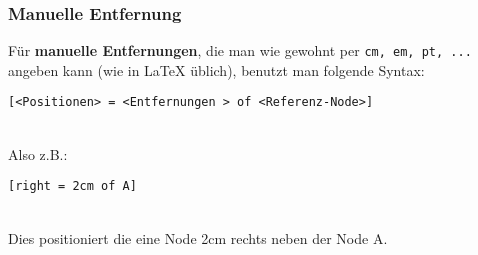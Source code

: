 \documentclass{article}
\begin{document}
		\subsubsection{Manuelle Entfernung}
		Für \textbf{manuelle Entfernungen}, die man wie gewohnt per \texttt{cm, em, pt, ...} angeben kann (wie in \LaTeX{} üblich), benutzt man folgende Syntax:\\
		\begin{minipage}{\linewidth}
			\begin{lstlisting}[caption={Syntax für die Positionierung von Nodes.}]
[<Positionen> = <Entfernungen > of <Referenz-Node>]
			\end{lstlisting}
		\end{minipage}\\
		Also z.B.:\\
		\begin{minipage}{\linewidth}
			\begin{lstlisting}[mathescape,caption={Manuelle Positionierung einer Node rechts von A.}]
[right = 2cm of A]
			\end{lstlisting}
		\end{minipage}\\
		Dies positioniert die eine Node 2cm rechts neben der Node A.
\end{document}
